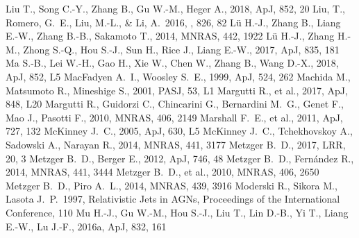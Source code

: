 \documentclass[a4paper,fleqn,usenatbib]{mnras}
\begin{document}
\begin{thebibliography}{207}
 Liu T., Song C.-Y., Zhang B., Gu W.-M., Heger A., 2018, ApJ, 852, 20
 Liu, T., Romero, G.~E., Liu, M.-L., \& Li, A.\ 2016, \apj, 826, 82
 L{\"u} H.-J., Zhang B., Liang E.-W., Zhang B.-B., Sakamoto T., 2014, MNRAS, 442, 1922
 L{\"u} H.-J., Zhang H.-M., Zhong S.-Q., Hou S.-J., Sun H., Rice J., Liang E.-W., 2017, ApJ, 835, 181
 Ma S.-B., Lei W.-H., Gao H., Xie W., Chen W., Zhang B., Wang D.-X., 2018, ApJ, 852, L5
 MacFadyen A.~I., Woosley S.~E., 1999, ApJ, 524, 262
 Machida M., Matsumoto R., Mineshige S., 2001, PASJ, 53, L1
 Margutti R., et al., 2017, ApJ, 848, L20
 Margutti R., Guidorzi C., Chincarini G., Bernardini M.~G., Genet F., Mao J., Pasotti F., 2010, MNRAS, 406, 2149
 Marshall F.~E., et al., 2011, ApJ, 727, 132
 McKinney J.~C., 2005, ApJ, 630, L5
 McKinney J.~C., Tchekhovskoy A., Sadowski A., Narayan R., 2014, MNRAS, 441, 3177
 Metzger B.~D., 2017, LRR, 20, 3
 Metzger B.~D., Berger E., 2012, ApJ, 746, 48
 Metzger B.~D., Fern{\'a}ndez R., 2014, MNRAS, 441, 3444
 Metzger B.~D., et al., 2010, MNRAS, 406, 2650
 Metzger B.~D., Piro A.~L., 2014, MNRAS, 439, 3916
 Moderski R., Sikora M., Lasota J.~P.\ 1997, Relativistic Jets in AGNs, Proceedings of the International Conference, 110
 Mu H.-J., Gu W.-M., Hou S.-J., Liu T., Lin D.-B., Yi T., Liang E.-W., Lu J.-F., 2016a, ApJ, 832, 161

\end{thebibliography}
\end{document}
